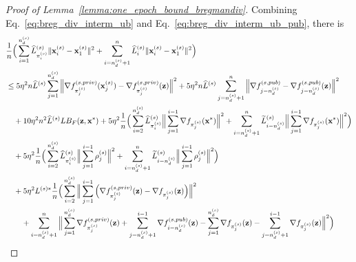 \begin{proof}[Proof of Lemma~\ref{lemma:one_epoch_bound_bregmandiv}]
    Combining Eq.~\ref{eq:breg_div_interm_ub} and Eq.~\ref{eq:breg_div_interm_ub_pub}, there is
    \begin{align}
    \label{eq:breg_div_interm_ub_sum}
        &\frac{1}{n}\Big( \sum_{i=1}^{n_d^{(s)}} \widehat{L}_{\pi_i^{(s)}}^{(s)} \|{\mathbf{x}}_i^{(s)} - {\mathbf{x}}_1^{(s)} \|^2 
        + \sum_{i=n_d^{(s)}+1}^{n} \widehat{L}_i^{(s)} \|{\mathbf{x}}_i^{(s)} - {\mathbf{x}}_1^{(s)}\|^2\Big) \\
        \nonumber
        &\leq 5\eta^2 n \widehat{L}^{(s)} \sum_{j=1}^{n_d^{(s)}}\Big\| \nabla f_{\pi_j^{(s)}}^{(s, priv)}({\mathbf{x}}_{j}^{(s)}) - \nabla f_{\pi_j^{(s)}}^{(s, priv)}({\mathbf{z}})\Big\|^2
        + 5\eta^2 n \widehat{L}^{(s)} \sum_{j=n_d^{(s)}+1}^{n}\Big\| \nabla f_{j-n_d^{(s)}}^{(s, pub)} - \nabla f_{j-n_d^{(s)}}^{(s,pub)}({\mathbf{z}})\Big\|^2 \\
        \nonumber
        &\quad + 10 \eta^2 n^2 \widehat{L}^{(s)} L B_F({\mathbf{z}}, {\mathbf{x}}^*)
        + 5 \eta^2 \frac{1}{n} \Big(\sum_{i=2}^{n_d^{(s)}}\widehat{L}_{\pi_i^{(s)}}^{(s)}\Big\| \sum_{j=1}^{i-1} \nabla f_{\pi_j^{(s)}}({\mathbf{x}}^*)\Big\|^2
        + \sum_{i=n_d^{(s)}+1}^{n}\widetilde{L}_{i-n_d^{(s)}}^{(s)}\Big\| \sum_{j=1}^{i-1}\nabla f_{\pi_j^{(s)}}({\mathbf{x}}^*)\Big\|^2 \Big)\\
        \nonumber
        &\quad 
        + 5\eta^2 \frac{1}{n} \Big( \sum_{i=2}^{n_d^{(s)}} \widehat{L}_{\pi_i^{(s)}}^{(s)} \Big\| \sum_{j=1}^{i-1} \rho_j^{(s)}\Big\|^2
        + \sum_{i=n_d^{(s)}+1}^{n} \widetilde{L}_{i-n_d^{(s)}}^{(s)}\Big\| \sum_{j=1}^{i-1} \rho_j^{(s)}\Big\|^2\Big)\\
        \nonumber
        &\quad + 5\eta^2 L^{(s)*} \frac{1}{n}\Big(\sum_{i=2}^{n_d^{(s)}}
        \Big\| \sum_{j=1}^{i-1} \Big( \nabla f_{\pi_j^{(s)}}^{(s, priv)}({\mathbf{z}}) - \nabla f_{\pi_j^{(s)}}({\mathbf{z}})\Big) \Big\|^2
        \\
        \nonumber
        &\quad \quad + \sum_{i=n_d^{(s)} + 1}^{n} \Big\| \sum_{j=1}^{n_d^{(s)}} \nabla f_{\pi_j^{(s)}}^{(s, priv)}({\mathbf{z}}) + \sum_{j=n_d^{(s)}+1}^{i-1} \nabla f_{i-n_d^{(s)}}^{(s, pub)}({\mathbf{z}})
            - \sum_{j=1}^{n_d^{(s)}} \nabla f_{\pi_j^{(s)}}({\mathbf{z}}) - \sum_{j=n_d^{(s)}+1}^{i-1} \nabla f_{\pi_j^{(s)}}({\mathbf{z}})
        \Big\|^2
        \Big)
    \end{align}


\end{proof}
